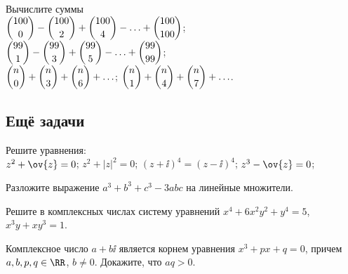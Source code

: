 \begin{problems}

\item
Вычислите суммы
\\[1ex]
\sbp
\(
    \dbinom{100}{0} - \dbinom{100}{2} + \dbinom{100}{4}
    - \ldots +
    \dbinom{100}{100}
\);
\\[1ex]
\sbp
\(
    \dbinom{99}{1} - \dbinom{99}{3} + \dbinom{99}{5}
    - \ldots +
    \dbinom{99}{99}
\);
\\[1ex]
\sbpx{*}
\(
    \dbinom{n}{0} + \dbinom{n}{3} + \dbinom{n}{6}
    + \ldots
\);
\qquad
\sbpx{*}
\(
    \dbinom{n}{1} + \dbinom{n}{4} + \dbinom{n}{7} + \ldots
\).

\end{problems}


\subsection*{Ещё задачи}

\begin{problems}

\item
Решите уравнения:
\\
\sbp $z^2 + \ov{z} = 0$;
\quad
\sbp $z^2 + |z|^2 = 0$;
\quad
\sbp $(z + \ii)^4 = (z - \ii)^4$;
\quad
\sbp $z^3 - \ov{z} = 0$;

\item
Разложите выражение $a^3 + b^3 + c^3 - 3 a b c$ на линейные множители.

\item
Решите в комплексных числах систему уравнений
$x^4 + 6 x^2 y^2 + y^4 = 5$,
$x^3 y + x y^3 = 1$.

\item
Комплексное число $a + b \ii$ является корнем уравнения $x^3 + p x + q = 0$,
причем $a, b, p, q \in \RR$, $b \neq 0$.
Докажите, что $a q > 0$.

\end{problems}

